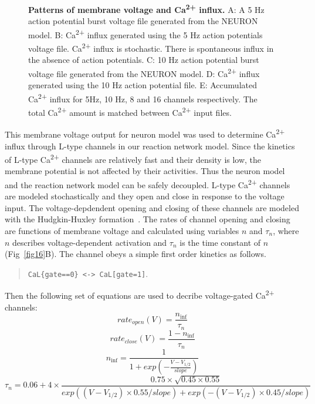 \documentclass[10pt,letterpaper]{article}
\begin{document}
\begin{figure}[!h]
	\caption{{\bf Patterns of membrane voltage and Ca\textsuperscript{2+} influx. }
	A: A 5 Hz action potential burst voltage file generated from the NEURON model. 
	B: Ca\textsuperscript{2+} influx generated using the 5 Hz action potentials voltage file. Ca\textsuperscript{2+} influx is stochastic. There is spontaneous influx in the absence of action potentials. 
	C: 10 Hz action potential burst voltage file generated from the NEURON model. 
	D: Ca\textsuperscript{2+} influx generated using the 10 Hz action potential file. 
	E: Accumulated Ca\textsuperscript{2+} influx for 5Hz, 10 Hz, 8 and 16 channels respectively. The total Ca\textsuperscript{2+} amount is matched between Ca\textsuperscript{2+} input files.
	}
\label{fig15}
\end{figure}

This membrane voltage output for neuron model was used to determine Ca\textsuperscript{2+} influx through L-type channels in our reaction network model. Since the kinetics of L-type Ca\textsuperscript{2+} channels are relatively fast and their density is low, the membrane potential is not affected by their activities. Thus the neuron model and the reaction network model can be safely decoupled. L-type Ca\textsuperscript{2+} channels are modeled stochastically and they open and close in response to the voltage input. The voltage-depdendent opening and closing of these channels are modeled with the Hudgkin-Huxley formation~\cite{Tuckwell:2012tt}. The rates of channel opening and closing are functions of membrane voltage and calculated using variables $n$ and $\tau_n$, where $n$ describes voltage-dependent activation and $\tau_n$ is the time constant of $n$ (Fig~\ref{fig16}B). The channel obeys a simple first order kinetics as follows.

\begin{quote}
 \verb|CaL{gate==0} <-> CaL[gate=1]|.
\end{quote}
Then the following set of equations are used to decribe voltage-gated Ca\textsuperscript{2+} channels:
\begin{equation}rate_{open}(V)=\frac{n_{\inf}}{\tau_n}\end{equation}
\begin{equation}rate_{close}(V)=\frac{1-n_{\inf}}{\tau_n}\end{equation}
\begin{equation}n_{\inf}=\frac{1}{1+exp(-\frac{V-V_{1/2}}{slope})}\end{equation}
\begin{equation}\tau_n=0.06+4\times\frac{0.75\times\sqrt{0.45\times0.55}}{exp((V-V_{1/2})\times0.55/slope)+exp(-(V-V_{1/2})\times0.45/slope)}\end{equation}
\end{document}
